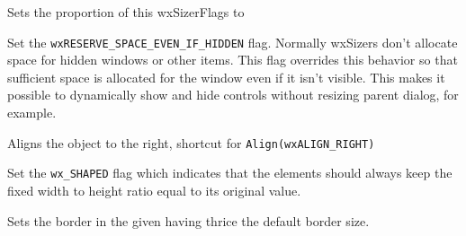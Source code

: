 
Sets the proportion of this wxSizerFlags to 


\label{wxsizerflagsreservespaceevenifhidden}


Set the \texttt{wxRESERVE\_SPACE\_EVEN\_IF\_HIDDEN} flag. Normally wxSizers
don't allocate space for hidden windows or other items. This flag overrides
this behavior so that sufficient space is allocated for the window even if it
isn't visible. This makes it possible to dynamically show and hide controls
without resizing parent dialog, for example. 


\label{wxsizerflagsright}


Aligns the object to the right, shortcut for \texttt{Align(wxALIGN\_RIGHT)}




\label{wxsizerflagsshaped}


Set the \texttt{wx\_SHAPED} flag which indicates that the elements should
always keep the fixed width to height ratio equal to its original value.


\label{wxsizerflagstriplebleborder}


Sets the border in the given  having thrice the default border
size.


